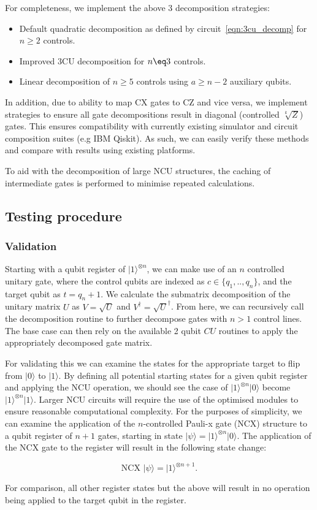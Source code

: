 For completeness, we implement the above 3 decomposition strategies:
\begin{itemize}
\item Default quadratic decomposition as defined by circuit~\eqref{eqn:3cu_decomp} for $n \geq 2$ controls.
\item Improved 3CU decomposition for $n \eq 3$ controls.
\item Linear decomposition of $n \geq 5$ controls using $a\geq n-2$ auxiliary qubits.
\end{itemize}

In addition, due to ability to map CX gates to CZ and vice versa, we implement strategies to ensure all gate decompositions result in diagonal (controlled $\sqrt[k]{Z}$) gates. This ensures compatibility with currently existing simulator and circuit composition suites (e.g IBM Qiskit). As such, we can easily verify these methods and compare with results using existing platforms.

To aid with the decomposition of large NCU structures, the caching of intermediate gates is performed to minimise repeated calculations.
 
\subsection{Testing procedure}

\subsubsection{Validation}
Starting with a qubit register of $\vert 1 \rangle^{\otimes n}$, we can make use of an $n$ controlled unitary gate, where the control qubits are indexed as $c \in \{q_1,..,q_{n} \}$, and the target qubit as $ t = q_n+1$. We calculate the submatrix decomposition of the unitary matrix $U$ as $V=\sqrt{U}$ and $V^{\dagger}=\sqrt{U}^{\dagger}$. From here, we can recursively call the decomposition routine to further decompose gates with $n>1$ control lines. The base case can then rely on the available 2 qubit $CU$ routines to apply the appropriately decomposed gate matrix.

For validating this we can examine the states for the appropriate target to flip from $\vert 0\rangle$ to $\vert 1 \rangle$. By defining all potential starting states for a given qubit register and applying the NCU operation, we should see the case of $\vert 1 \rangle^{\otimes n} \vert 0 \rangle$ become $\vert 1 \rangle^{\otimes n} \vert 1 \rangle$. Larger NCU circuits will require the use of the optimised modules to ensure reasonable computational complexity. For the purposes of simplicity, we can examine the application of the $n$-controlled Pauli-x gate (NCX) structure to a qubit register of $n+1$ gates, starting in state $\vert \psi \rangle = \vert 1\rangle^{\otimes n} \vert 0 \rangle$. The application of the NCX gate to the register will result in the following state change:

\begin{equation}
 \textrm{NCX }\vert \psi \rangle = \vert 1\rangle^{\otimes n+1}.
\end{equation}

For comparison, all other register states but the above will result in no operation being applied to the target qubit in the register.